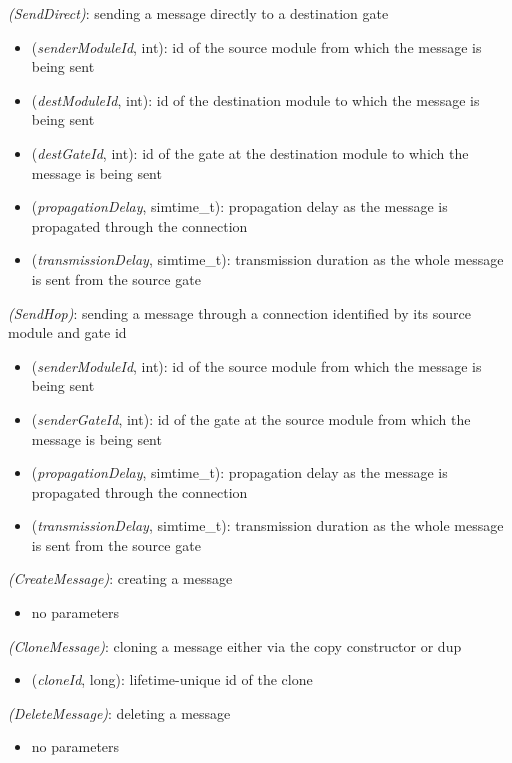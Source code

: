  \textit{(SendDirect)}: sending a message directly to a destination gate

\begin{itemize}
  \item {} (\textit{senderModuleId}, int): id of the source module from which the message is being sent
  \item {} (\textit{destModuleId}, int): id of the destination module to which the message is being sent
  \item {} (\textit{destGateId}, int): id of the gate at the destination module to which the message is being sent
  \item {} (\textit{propagationDelay}, simtime\_t): propagation delay as the message is propagated through the connection
  \item {} (\textit{transmissionDelay}, simtime\_t): transmission duration as the whole message is sent from the source gate
\end{itemize}

 \textit{(SendHop)}: sending a message through a connection identified by its source module and gate id

\begin{itemize}
  \item {} (\textit{senderModuleId}, int): id of the source module from which the message is being sent
  \item {} (\textit{senderGateId}, int): id of the gate at the source module from which the message is being sent
  \item {} (\textit{propagationDelay}, simtime\_t): propagation delay as the message is propagated through the connection
  \item {} (\textit{transmissionDelay}, simtime\_t): transmission duration as the whole message is sent from the source gate
\end{itemize}

 \textit{(CreateMessage)}: creating a message

\begin{itemize}
  \item no parameters
\end{itemize}

 \textit{(CloneMessage)}: cloning a message either via the copy constructor or dup

\begin{itemize}
  \item {} (\textit{cloneId}, long): lifetime-unique id of the clone
\end{itemize}

 \textit{(DeleteMessage)}: deleting a message

\begin{itemize}
  \item no parameters
\end{itemize}

